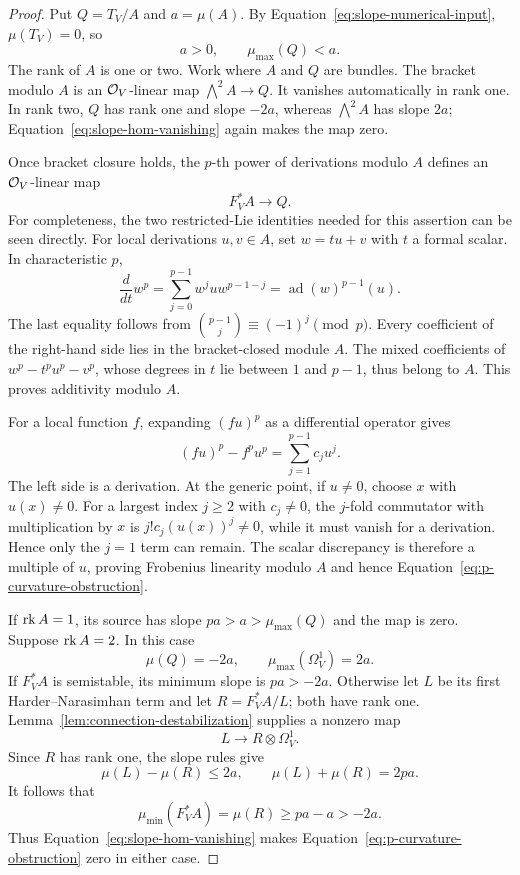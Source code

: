 \begin{proof}
Put $Q=T_V/A$ and $a=\mu(A)$.  By
Equation~\eqref{eq:slope-numerical-input}, $\mu(T_V)=0$, so
\[
  a>0,\qquad \mu_{\max}(Q)<a.
\]
The rank of $A$ is one or two.  Work where $A$ and $Q$ are bundles.  The
bracket modulo $A$ is an $\mathcal O_V$-linear map
$\bigwedge^2A\to Q$.  It vanishes automatically in rank one.  In rank two,
$Q$ has rank one and slope $-2a$, whereas $\bigwedge^2A$ has slope $2a$;
Equation~\eqref{eq:slope-hom-vanishing} again makes the map zero.

Once bracket closure holds, the $p$-th power of derivations modulo $A$
defines an $\mathcal O_V$-linear map
\begin{equation}
  F_V^*A\longrightarrow Q.
  \label{eq:p-curvature-obstruction}
\end{equation}
For completeness, the two restricted-Lie identities needed for this
assertion can be seen directly.  For local derivations $u,v\in A$, set
$w=tu+v$ with $t$ a formal scalar.  In characteristic $p$,
\[
  \frac{d}{dt}w^p
  =\sum_{j=0}^{p-1}w^juw^{p-1-j}
  =\operatorname{ad}(w)^{p-1}(u).
\]
The last equality follows from
$\binom{p-1}{j}\equiv(-1)^j\pmod p$.  Every coefficient of the right-hand
side lies in the bracket-closed module $A$.  The mixed coefficients of
$w^p-t^pu^p-v^p$, whose degrees in $t$ lie between $1$ and $p-1$, thus
belong to $A$.  This proves additivity modulo $A$.

For a local function $f$, expanding $(fu)^p$ as a differential operator
gives
\[
  (fu)^p-f^pu^p=\sum_{j=1}^{p-1}c_ju^j.
\]
The left side is a derivation.  At the generic point, if $u\ne0$, choose
$x$ with $u(x)\ne0$.  For a largest index $j\ge2$ with $c_j\ne0$, the
$j$-fold commutator with multiplication by $x$ is
$j!c_j(u(x))^j\ne0$, while it must vanish for a derivation.  Hence only
the $j=1$ term can remain.  The scalar discrepancy is therefore a
multiple of $u$, proving Frobenius linearity modulo $A$ and hence
Equation~\eqref{eq:p-curvature-obstruction}.

If $\operatorname{rk} A=1$, its source has slope $pa>a>\mu_{\max}(Q)$ and the map is
zero.  Suppose $\operatorname{rk} A=2$.  In this case
\[
  \mu(Q)=-2a,\qquad \mu_{\max}(\Omega_V^1)=2a.
\]
If $F_V^*A$ is semistable, its minimum slope is $pa>-2a$.  Otherwise let
$L$ be its first Harder--Narasimhan term and let $R=F_V^*A/L$; both have
rank one.  Lemma~\ref{lem:connection-destabilization} supplies a nonzero
map
\[
  L\longrightarrow R\otimes\Omega_V^1.
\]
Since $R$ has rank one, the slope rules give
\[
  \mu(L)-\mu(R)\le2a,\qquad
  \mu(L)+\mu(R)=2pa.
\]
It follows that
\[
  \mu_{\min}(F_V^*A)=\mu(R)\ge pa-a>-2a.
\]
Thus Equation~\eqref{eq:slope-hom-vanishing} makes
Equation~\eqref{eq:p-curvature-obstruction} zero in either case.
\end{proof}

